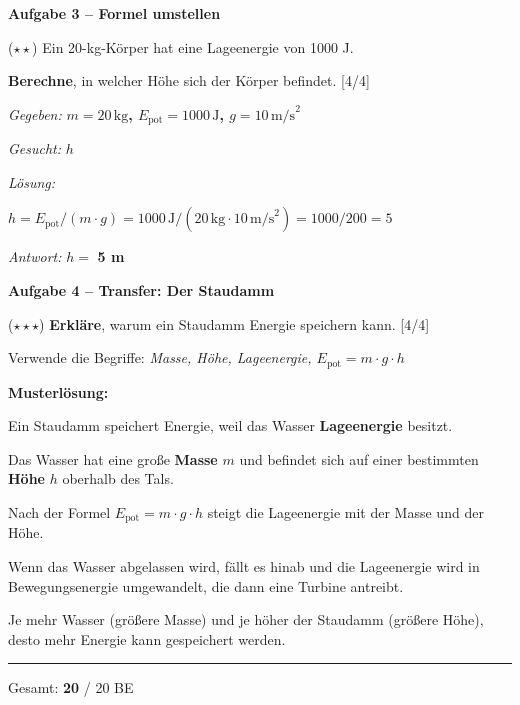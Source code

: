 \documentclass[11pt, a4paper]{article}
\newcommand{\maxpunkte}{20}
\newcommand{\lsg}[1]{\textcolor{loesung}{\textbf{#1}}}
\newcommand{\punktebox}[1]{\hfill\small\textcolor{mittelgrau}{[\textcolor{loesung}{#1}/#1]}}
\newcommand{\aufgabe}[1]{%
    \needspace{4\baselineskip}%
    \vspace{10pt}%
    \noindent\textbf{\textcolor{fachfarbe}{Aufgabe #1}}%
    \vspace{4pt}%
    \nopagebreak[4]%
}
\newcommand{\operator}[1]{\textbf{\textcolor{fachfarbe}{#1}}}
\begin{document}
\vspace{0.8em}

\aufgabe{3 – Formel umstellen}

($\star\star$) Ein 20-kg-Körper hat eine Lageenergie von 1000 J.

\operator{Berechne}, in welcher Höhe sich der Körper befindet. \punktebox{4}

\vspace{0.3em}
\textit{Gegeben:} \lsg{$m = 20\,\text{kg}$, $E_\text{pot} = 1000\,\text{J}$, $g = 10\,\text{m/s}^2$}

\vspace{0.3em}
\textit{Gesucht:} \lsg{$h$}

\vspace{0.3em}
\textit{Lösung:}

\lsg{$h = E_\text{pot} / (m \cdot g) = 1000\,\text{J} / (20\,\text{kg} \cdot 10\,\text{m/s}^2) = 1000 / 200 = 5$}

\vspace{0.3em}
\textit{Antwort:} $h = $ \lsg{5 m}

\vspace{1em}

\aufgabe{4 – Transfer: Der Staudamm}

($\star\star\star$) \operator{Erkläre}, warum ein Staudamm Energie speichern kann. \punktebox{4}

Verwende die Begriffe: \textit{Masse, Höhe, Lageenergie, $E_\text{pot} = m \cdot g \cdot h$}

\vspace{0.5em}
\textcolor{loesung}{\textbf{Musterlösung:}}

\textcolor{loesung}{Ein Staudamm speichert Energie, weil das Wasser \textbf{Lageenergie} besitzt.}

\textcolor{loesung}{Das Wasser hat eine große \textbf{Masse} $m$ und befindet sich auf einer bestimmten \textbf{Höhe} $h$ oberhalb des Tals.}

\textcolor{loesung}{Nach der Formel $E_\text{pot} = m \cdot g \cdot h$ steigt die Lageenergie mit der Masse und der Höhe.}

\textcolor{loesung}{Wenn das Wasser abgelassen wird, fällt es hinab und die Lageenergie wird in Bewegungsenergie umgewandelt, die dann eine Turbine antreibt.}

\textcolor{loesung}{Je mehr Wasser (größere Masse) und je höher der Staudamm (größere Höhe), desto mehr Energie kann gespeichert werden.}

\vspace{1em}


\vfill
\hrule
\vspace{0.3em}
\begin{center}
\small\textcolor{mittelgrau}{Gesamt: \textcolor{loesung}{\textbf{20}} / \maxpunkte{} BE}
\end{center}
\end{document}
